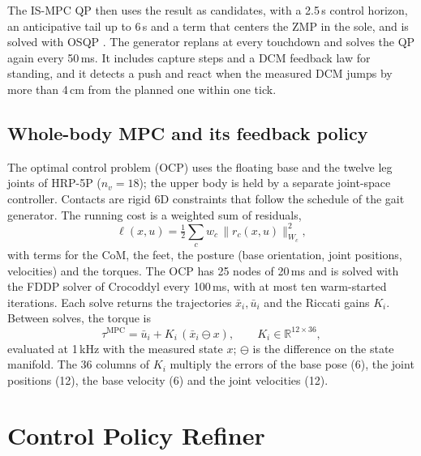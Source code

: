 \documentclass[conference]{IEEEtran}
\newcommand{\R}{\mathbb{R}}
\newcommand{\mpc}{\mathrm{MPC}}
\newcommand{\xb}{\bar{x}}
\newcommand{\ub}{\bar{u}}
\begin{document}
The IS-MPC QP then uses the result as candidates, with a 2.5\,s control horizon, an anticipative tail up to 6\,s and a term that centers the ZMP in the sole, and is solved with OSQP \cite{stellato2020osqp}.
The generator replans at every touchdown and solves the QP again every 50\,ms.
It includes capture steps and a DCM feedback law for standing, and it detects a push and react when the measured DCM jumps by more than 4\,cm from the planned one within one tick.

\subsection{Whole-body MPC and its feedback policy}
The optimal control problem (OCP) uses the floating base and the twelve leg joints of HRP-5P \cite{kaneko2019hrp5p} ($n_v=18$); the upper body is held by a separate joint-space controller.
Contacts are rigid 6D constraints that follow the schedule of the gait generator.
The running cost is a weighted sum of residuals,
\begin{equation}
\ell(x,u)=\tfrac12\sum_{c}w_c\,\|r_c(x,u)\|^2_{W_c},
\label{eq:costwb}
\end{equation}
with terms for the CoM, the feet, the posture (base orientation, joint positions, velocities) and the torques.
The OCP has 25 nodes of 20\,ms and is solved with the FDDP solver of Crocoddyl \cite{mastalli2020crocoddyl} every 100\,ms, with at most ten warm-started iterations.
Each solve returns the trajectories $\xb_i,\ub_i$ and the Riccati gains $K_i$.
Between solves, the torque is
\begin{equation}
\tau^{\mpc}=\ub_i+K_i\,(\xb_i\ominus x),\qquad K_i\in\R^{12\times36},
\label{eq:riccati}
\end{equation}
evaluated at 1\,kHz with the measured state $x$; $\ominus$ is the difference on the state manifold.
The 36 columns of $K_i$ multiply the errors of the base pose (6), the joint positions (12), the base velocity (6) and the joint velocities (12).

\section{Control Policy Refiner}
\label{sec:method}
\end{document}
